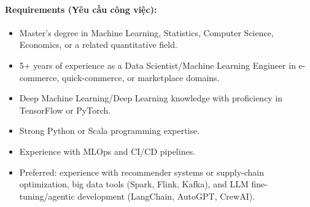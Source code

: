 \paragraph{Requirements (Yêu cầu công việc):}
\begin{itemize}
    \item Master's degree in Machine Learning, Statistics, Computer Science, Economics, or a related quantitative field.
    \item 5+ years of experience as a Data Scientist/Machine Learning Engineer in e-commerce, quick-commerce, or marketplace domains.
    \item Deep Machine Learning/Deep Learning knowledge with proficiency in TensorFlow or PyTorch.
    \item Strong Python or Scala programming expertise.
    \item Experience with MLOps and CI/CD pipelines.
    \item Preferred: experience with recommender systems or supply-chain optimization, big data tools (Spark, Flink, Kafka), and LLM fine-tuning/agentic development (LangChain, AutoGPT, CrewAI).
\end{itemize}
